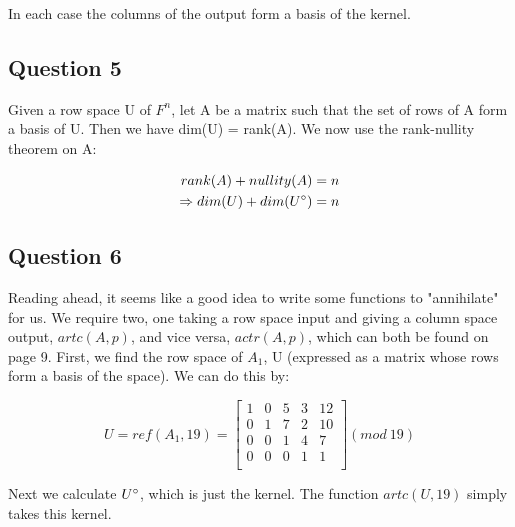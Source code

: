 \documentclass[10pt,a4paper]{report}
\begin{document}
\vspace{5mm}

In each case the columns of the output form a basis of the kernel.

\subsection*{Question 5}

Given a row space U of $F^n$, let A be a matrix such that the set of rows of A form a basis of U. Then we have dim(U) = rank(A). We now use the rank-nullity theorem on A:

\begin{equation*}
\begin{split}
rank(A) + nullity(A) = n \\
\Rightarrow dim(U) + dim(U\degree) = n
\end{split}
\end{equation*}

\subsection*{Question 6}

Reading ahead, it seems like a good idea to write some functions to "annihilate" for us. We require two, one taking a row space input and giving a column space output, $artc(A,p)$, and vice versa, $actr(A,p)$, which can both be found on page 9. First, we find the row space of $A_1$, U (expressed as a matrix whose rows form a basis of the space). We can do this by:

\vspace{5mm}

\begin{equation*}
U=ref(A_1,19)=\begin{bmatrix}
1 & 0 & 5 & 3 & 12 \\
0 & 1 & 7 & 2 & 10\\
0 & 0 & 1 & 4 & 7\\
0 & 0 & 0 & 1 & 1\\
\end{bmatrix} (mod \: 19)
\end{equation*}

\vspace{5mm}

Next we calculate $U\degree$, which is just the kernel. The function $artc(U,19)$ simply takes this kernel.

\vspace{5mm}
\end{document}
